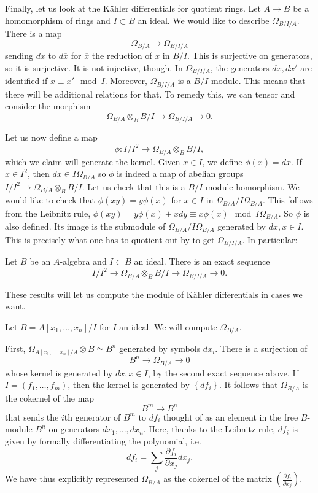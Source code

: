 Finally, let us look at the K\"ahler differentials for quotient rings. Let $A
\to  B$ be a  homomorphism of rings and $I \subset B $ an ideal. We would like
to describe $\Omega_{B/I/A} $. There is a map
\[ \Omega_{B/A} \to \Omega_{B/I/A}  \]
sending $dx$ to $d \overline{x}$ for $\overline{x}$ the reduction of $x$ in
$B/I$. This is surjective on generators, so it is surjective. It is not
injective, though. In $\Omega_{B/I/A}$, the generators $dx, dx'$ are identified
if $x \equiv x' \mod I$.  Moreover, $\Omega_{B/I/A}$ is a 
$B/I$-module. 
This means that there will be additional relations for that. To remedy this, we
can tensor and consider the morphism
\[ \Omega_{B/A} \otimes_B B/I \to \Omega_{B/I/A} \to 0.  \]

Let us now define a map 
\[ \phi: I /I^2 \to \Omega_{B/A} \otimes_B B/I,  \]
which we claim will generate the kernel. Given $x \in I$, we define $\phi(x) =
dx$. If $x \in I^2$, then $dx \in I \Omega_{B/A}$ so $\phi$ is indeed a map of
abelian groups
$I/I^2 \to \Omega_{B/A} \otimes_B B/I$. Let us check that this is a
$B/I$-module homorphism. We would like to check that $\phi(xy) = y \phi(x)$
for $x \in I$ in
$\Omega_{B/A}/I \Omega_{B/A}$. This follows from the Leibnitz rule, $\phi(xy) =
y \phi(x) + xdy \equiv x \phi(x) \mod I \Omega_{B/A}$. So $\phi$ is also
defined. Its image is the submodule of $\Omega_{B/A}/I \Omega_{B/A}$ generated
by $dx, x \in I$. This is precisely what one has to quotient out by to get
$\Omega_{B/I/A}$. In particular:

\begin{proposition} Let $B$ be an $A$-algebra and $I \subset B$ an ideal.
There is an exact sequence
\[ I/I^2 \to \Omega_{B/A} \otimes_B B/I \to \Omega_{B/I/A} \to 0.  \]
\end{proposition} 

These results will let us compute the module of K\"ahler differentials in cases
we want.

\begin{example} 
Let $B = A[x_1, \dots, x_n]/I$ for $I$ an ideal. We will compute $\Omega_{B/A}$.

First, $\Omega_{A[x_1, \dots, x_n]/A} \otimes B \simeq B^n$ generated by
symbols $dx_i$. There is a surjection of
\[ B^n \to \Omega_{B/A} \to 0  \]
whose kernel is generated by $dx, x \in I$, by the second exact sequence above.
If $I = (f_1, \dots, f_m)$, then the kernel is generated by 
$\left\{df_i\right\}$.
It follows that $\Omega_{B/A}$ is the cokernel of the map
\[ B^m \to B^n  \]
that sends the $i$th generator of $B^m$ to $df_i$ thought of as an element in
the free $B$-module $B^n$ on generators $dx_1, \dots, dx_n$. Here, thanks to
the Leibnitz rule, $df_i$ is
given by formally differentiating the polynomial, i.e.
\[ df_i = \sum_j \frac{\partial f_i}{\partial x_j} dx_j. \] We have thus
explicitly represented $\Omega_{B/A}$ as the cokernel of the matrix $\left(
\frac{\partial f_i}{\partial x_j}\right)$.
\end{example} 

